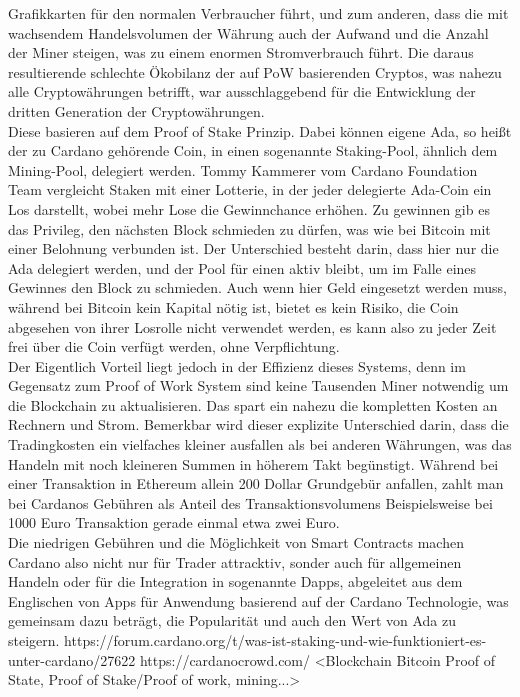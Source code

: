 \documentclass[12pt]{article}
\begin{document}
Grafikkarten für den normalen Verbraucher führt, und zum anderen, dass die mit wachsendem Handelsvolumen der Währung auch der Aufwand und die Anzahl der Miner steigen, was zu einem enormen Stromverbrauch führt. Die daraus resultierende schlechte Ökobilanz der auf PoW basierenden Cryptos, was nahezu alle Cryptowährungen betrifft, war ausschlaggebend für die Entwicklung der dritten Generation der Cryptowährungen.\\
		Diese basieren auf dem Proof of Stake Prinzip. Dabei können eigene Ada, so heißt der zu Cardano gehörende Coin, in einen sogenannte Staking-Pool, ähnlich dem Mining-Pool, delegiert werden. Tommy Kammerer vom Cardano Foundation Team vergleicht Staken mit einer Lotterie, in der jeder delegierte Ada-Coin ein Los darstellt, wobei mehr Lose die Gewinnchance erhöhen. Zu gewinnen gib es das Privileg, den nächsten Block schmieden zu dürfen, was wie bei Bitcoin mit einer Belohnung verbunden ist. Der Unterschied besteht darin, dass hier nur die Ada delegiert werden, und der Pool für einen aktiv bleibt, um im Falle eines Gewinnes den Block zu schmieden. Auch wenn hier Geld eingesetzt werden muss, während bei Bitcoin kein Kapital nötig ist, bietet es kein Risiko, die Coin abgesehen von ihrer Losrolle nicht verwendet werden, es kann also zu jeder Zeit frei über die Coin verfügt werden, ohne Verpflichtung.\\
		Der Eigentlich Vorteil liegt jedoch in der Effizienz dieses Systems, denn im Gegensatz zum Proof of Work System sind keine Tausenden Miner notwendig um die Blockchain zu aktualisieren. Das spart ein nahezu die kompletten Kosten an Rechnern und Strom. Bemerkbar wird dieser explizite Unterschied darin, dass die Tradingkosten ein vielfaches kleiner ausfallen als bei anderen Währungen, was das Handeln mit noch kleineren Summen in höherem Takt begünstigt. Während bei einer Transaktion in Ethereum allein 200 Dollar Grundgebür anfallen, zahlt man bei Cardanos Gebühren als Anteil des Transaktionsvolumens Beispielsweise bei 1000 Euro Transaktion gerade einmal etwa zwei Euro.\\
		Die niedrigen Gebühren und die Möglichkeit von Smart Contracts machen Cardano also nicht nur für Trader attracktiv, sonder auch für allgemeinen Handeln oder für die Integration in sogenannte Dapps, abgeleitet aus dem Englischen von Apps für Anwendung basierend auf der Cardano Technologie, was gemeinsam dazu beträgt, die Popularität und auch den Wert von Ada zu steigern.
		https://forum.cardano.org/t/was-ist-staking-und-wie-funktioniert-es-unter-cardano/27622
		https://cardanocrowd.com/
		<Blockchain Bitcoin Proof of State, Proof of Stake/Proof of work, mining...>
\end{document}
